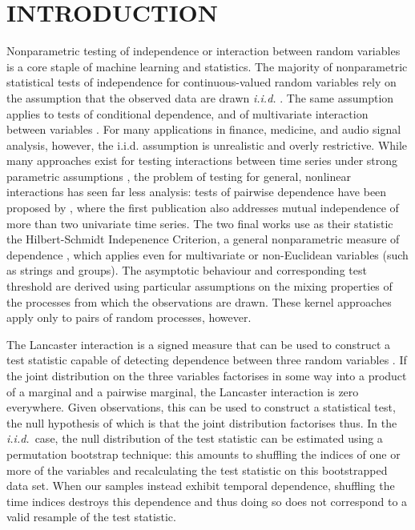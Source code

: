 \documentclass[]{article}
\begin{document}
\section{INTRODUCTION}\label{section:intro}
\label{introduction}
Nonparametric testing of independence or interaction between random variables is a core staple of machine learning and statistics. The majority of nonparametric statistical tests of independence for continuous-valued random variables   rely on the assumption that the observed data are drawn \emph{i.i.d.} \cite{Feuerverger93,gretton2007kernel,Szekely2007,GreGyo10,HelHelGor13}. The same assumption applies to tests of conditional dependence, and of multivariate interaction between variables \cite{Zhang2011,KanUsh98,FukGreSunSch08,sejdinovic2013kernel,PatSenSze15}.
For many applications in finance, medicine, and audio signal analysis, however, the i.i.d. assumption is unrealistic and overly restrictive.
While many approaches exist for testing interactions between time series under strong parametric assumptions %
\cite{kirchgassner2012introduction,ledford1996statistics}, the problem of testing for general, nonlinear interactions has seen far less analysis: tests of pairwise dependence have been proposed by \cite{GaiRupSch10,besserve_statistical_2013,chwialkowski2014wild, chwialkowski2014kernel}, where the first publication also addresses mutual independence of more than two univariate time series. The two final works use as their statistic the Hilbert-Schmidt Indepenence Criterion, a general nonparametric measure of dependence \citep{gretton2005measuring}, which applies even for multivariate or non-Euclidean variables (such as strings and groups).
The asymptotic behaviour and corresponding test threshold are derived using  particular assumptions on the mixing properties of the processes from which the observations are drawn. These kernel approaches apply only to pairs of random processes, however.

The Lancaster interaction is a signed measure that can be used to construct a test statistic capable of detecting dependence between three random variables \citep{lancaster1969chi,sejdinovic2013kernel}. If the joint distribution on the three variables factorises in some way into a product of a marginal and a pairwise marginal, the Lancaster interaction is zero everywhere. Given observations, this can be used to construct a statistical test, the null hypothesis of which is that the joint distribution factorises thus. 
In the \emph{i.i.d.}~case, the null distribution of the test statistic can be estimated using a permutation bootstrap technique: this amounts to shuffling the indices of one or more of the variables and recalculating the test statistic on this bootstrapped data set. When our samples instead exhibit temporal dependence, shuffling the time indices destroys this dependence and thus doing so does not correspond to a valid resample of the test statistic. 
\end{document}
